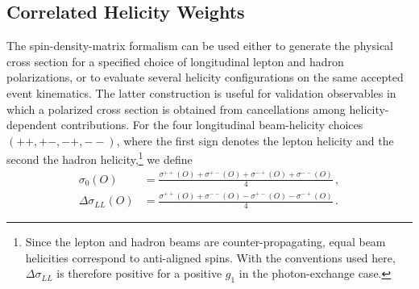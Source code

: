 \documentclass[a4paper,11pt]{article}
\begin{document}
\subsection{Correlated Helicity Weights}
\label{sec:correlated-helicity-weights}

The spin-density-matrix formalism can be used either to generate the physical cross section for a specified choice of longitudinal lepton and hadron polarizations, or to evaluate several helicity configurations on the same accepted event kinematics. The latter construction is useful for validation observables in which a polarized cross section is obtained from cancellations among helicity-dependent contributions. For the four longitudinal beam-helicity choices $(++,+-,-+,--)$, where the first sign denotes the lepton helicity and the second the hadron helicity,\footnote{Since the lepton and hadron beams are counter-propagating, equal beam helicities correspond to anti-aligned spins. With the conventions used here, $\Delta\sigma_{LL}$ is therefore positive for a positive $g_1$ in the photon-exchange case.} we define
\begin{equation}
\begin{aligned}
  \sigma_0(O)
  &=
  \frac{
  \sigma^{++}(O)+\sigma^{+-}(O)+\sigma^{-+}(O)+\sigma^{--}(O)}
  {4}\,,
  \\
  \Delta\sigma_{LL}(O)
  &=
  \frac{
  \sigma^{++}(O)+\sigma^{--}(O)-\sigma^{+-}(O)-\sigma^{-+}(O)}
  {4}\,.
\end{aligned}
\label{eq:helicity-combinations}
\end{equation}
\end{document}
